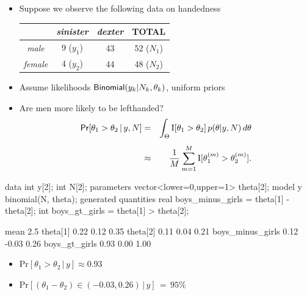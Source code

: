 \documentclass[10pt]{report}
\begin{document}


%
\vspace*{-4pt}
\begin{itemize}
\item Suppose we observe the following data on handedness
\begin{center}
{\small
\begin{tabular}{c|c|c||c}
     & {\slshape sinister} & {\slshape dexter} & TOTAL
\\ \hline \hline
{\slshape male} & 9 ($y_1$) & 43 & 52 ($N_1$)
\\
{\slshape female} & 4 ($y_2$) & 44 & 48 ($N_2$)
\end{tabular}
}
\end{center}
\item Assume likelihoods $\text{\sf Binomial}(y_k|N_k,\theta_k)$, uniform
  priors
\item Are men more likely to be lefthanded?
{\small
\begin{eqnarray*}
\text{\sf Pr}[\theta_1 > \theta_2 \, | \, y, N]
& = & 
\int_{\Theta} \text{I}[\theta_1 > \theta_2] \, p(\theta|y,N) \,
d\theta
\\[4pt]
& \approx & \frac{1}{M} \sum_{m=1}^M \text{I}[\theta_1^{(m)} > \theta_2^{(m)}].
\end{eqnarray*}
}
\end{itemize}


%
\begin{stancode}
data {
  int y[2];
  int N[2];
}
parameters {
  vector<lower=0,upper=1> theta[2];
}
model {
  y ~ binomial(N, theta);
}
generated quantities {
  real boys_minus_girls = theta[1] - theta[2];
  int boys_gt_girls = theta[1] > theta[2];
}
\end{stancode}


%
\begin{codeout}
                   mean    2.5%
theta[1]           0.22    0.12   0.35
theta[2]           0.11    0.04   0.21
boys_minus_girls   0.12   -0.03   0.26
boys_gt_girls      0.93    0.00   1.00
\end{codeout}
\begin{itemize}
\item 
$\mathrm{Pr}[\theta_1 > \theta_2 \,|\, y] \approx 0.93$
\item
$\mathrm{Pr}\left[
(\theta_1 - \theta_2) \in (-0.03, 0.26)
\,|\, y
\right] 
\, = \, 95\%$
\end{itemize}
\end{document}
